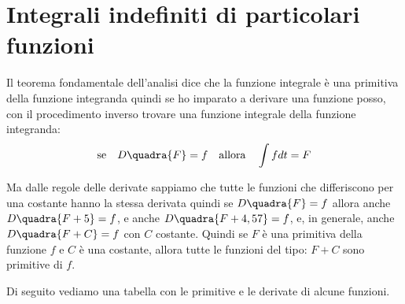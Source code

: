 \section{Integrali indefiniti di particolari funzioni}
\label{sec:integrali_indefiniti}

Il teorema fondamentale dell'analisi dice che la funzione integrale è una 
primitiva della funzione integranda quindi se ho imparato a derivare una 
funzione posso, con il procedimento inverso trovare una funzione integrale 
della funzione integranda:
\[\text{se} \quad D \quadra{F} = f \quad \text{allora} \quad \int f dt = F\]

Ma dalle regole delle derivate sappiamo che tutte le funzioni che 
differiscono per una costante hanno la stessa derivata quindi se 
\(D \quadra{F} = f\) allora anche \(D \quadra{F+5} = f\), e anche 
\(D \quadra{F+4,57} = f\), e, in generale, anche \(D \quadra{F+C} = f\) con 
\(C\) costante.
Quindi se \(F\) è una primitiva della funzione \(f\) e \(C\) è una 
costante, allora tutte le funzioni del tipo: \(F + C\) sono primitive di 
\(f\).

Di seguito vediamo una tabella con le primitive e le derivate di alcune 
funzioni.

% 

